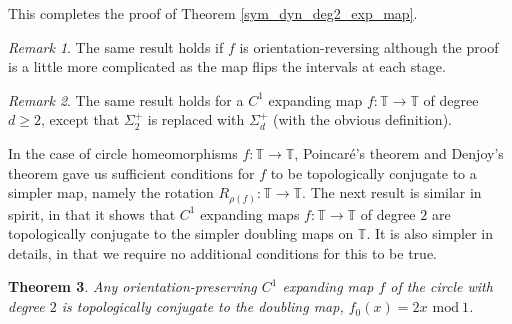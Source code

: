 \documentclass[12pt]{article}
\newtheorem{theorem}{Theorem}[section]
\theoremstyle{definition}
\theoremstyle{remark}
\newtheorem{remark}[theorem]{Remark}
\begin{document}
\medskip
This completes the proof of Theorem \ref{sym_dyn_deg2_exp_map}.

\begin{remark}
The same result holds if $f$ is orientation-reversing although the proof is a little more complicated as the map flips the intervals at each stage.
\end{remark}

\begin{remark}
The same result holds for a $C^1$ expanding map $f : \mathbb T \to \mathbb T$ of degree $d \ge 2$, except that
$\Sigma_2^+$ is replaced with $\Sigma_d^+$ (with the obvious definition).
\end{remark}

In the case of circle homeomorphisms $f : \mathbb T \to \mathbb T$, 
Poincar\'e's theorem and Denjoy's theorem gave us sufficient
conditions for $f$ to be topologically conjugate to a simpler map, namely the
rotation $R_{\rho(f)} : \mathbb T \to \mathbb T$.
The next result is similar in spirit, in that it shows that $C^1$ expanding maps $f : \mathbb T \to \mathbb T$ of degree
$2$ are topologically conjugate to the simpler doubling maps on $\mathbb T$. It is also simpler in details,
in that we require no additional conditions for this to be true.

\begin{theorem} \label{Exp_deg2_conj_doubling}
Any orientation-preserving $C^1$ expanding map $f$ of the circle with degree $2$ is topologically conjugate to the doubling map, $f_0(x)=2x$ $\mathrm{mod} \ 1$.
\end{theorem}
\end{document}
